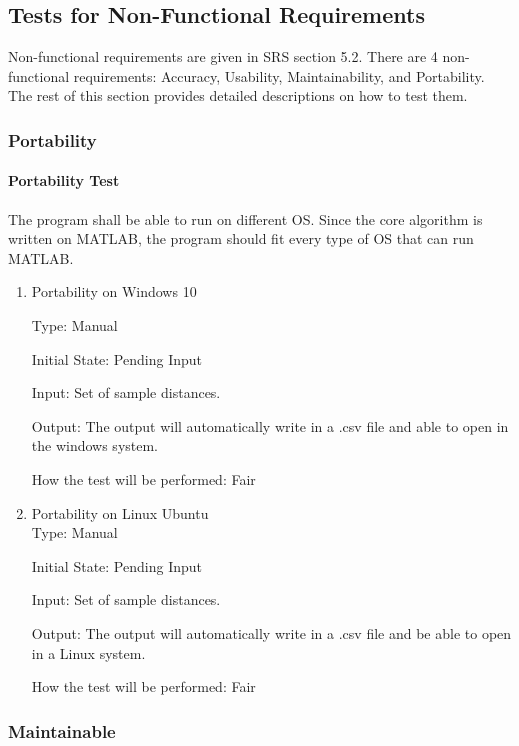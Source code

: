 \documentclass[12pt, titlepage]{article}
\begin{document}
\subsection{Tests for Non-Functional Requirements}
\label{tnfr}

Non-functional requirements are given in SRS section 5.2. There are 4 non-functional requirements: Accuracy, Usability, Maintainability, and Portability. The 
rest of this section provides detailed descriptions on how to test them.

\subsubsection{Portability}\label{Aport}

\paragraph{Portability Test} The program shall be able to run on different OS. Since the core algorithm is written on MATLAB, the program should fit every type of OS that can run MATLAB.\textsuperscript{\cite{rosellon2003different}}

\begin{enumerate}

\item{Portability on Windows 10\\}

Type: Manual
					
Initial State: Pending Input
					
Input: Set of sample distances.
					
Output: The output will automatically write in a .csv file and able to open in the windows system. 
					
How the test will be performed: Fair


\item{Portability on Linux Ubuntu}\\

Type: Manual
					
Initial State: Pending Input
					
Input: Set of sample distances.
					
Output: The output will automatically write in a .csv file and be able to open in a Linux system. 
					
How the test will be performed: Fair

\end{enumerate}

\subsubsection{Maintainable}\label{Amaintain}
\end{document}
